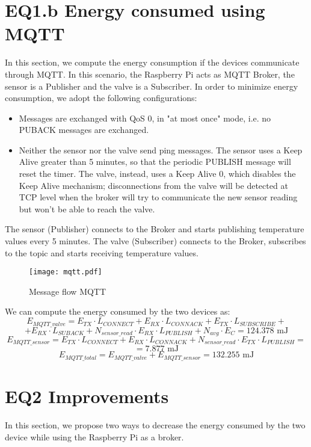 \section{EQ1.b Energy consumed using MQTT}
In this section, we compute the energy consumption if the devices communicate through MQTT. In this scenario, the Raspberry Pi acts as MQTT Broker, the sensor is a Publisher and the valve is a Subscriber. In order to minimize energy consumption, we adopt the following configurations:
\begin{itemize}
\item Messages are exchanged with QoS 0, in "at most once" mode, i.e. no PUBACK messages are exchanged.
\item Neither the sensor nor the valve send ping messages. The sensor uses a Keep Alive greater than 5 minutes, so that the periodic PUBLISH message will reset the timer. The valve, instead, uses a Keep Alive 0, which disables the Keep Alive mechanism; disconnections from the valve will be detected at TCP level when the broker will try to communicate the new sensor reading but won't be able to reach the valve.
\end{itemize}
The sensor (Publisher) connects to the Broker and starts publishing temperature values every 5 minutes. The valve (Subscriber) connects to the Broker, subscribes to the topic and starts receiving temperature values.
\begin{figure}[H]
    \centering
    \texttt{[image: mqtt.pdf]}
    \caption{Message flow MQTT}
\end{figure}
We can compute the energy consumed by the two devices as:
\[E_{MQTT\_valve} = E_{TX} \cdot L_{CONNECT} + E_{RX} \cdot L_{CONNACK} + E_{TX} \cdot L_{SUBSCRIBE} +\]
\[+ E_{RX} \cdot L_{SUBACK} + N_{sensor\_read} \cdot E_{RX} \cdot L_{PUBLISH} + N_{avg} \cdot E_{C} = 124.378 \text{ mJ}\]
\[E_{MQTT\_sensor} = E_{TX} \cdot L_{CONNECT} + E_{RX} \cdot L_{CONNACK} + N_{sensor\_read} \cdot E_{TX} \cdot L_{PUBLISH} =\]
\[= 7.877 \text{ mJ}\]
\[E_{MQTT\_total} = E_{MQTT\_valve} + E_{MQTT\_sensor} = 132.255 \text{ mJ}\]

\section{EQ2 Improvements}
In this section, we propose two ways to decrease the energy consumed by the two device while using the Raspberry Pi as a broker. 


